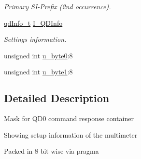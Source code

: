 \begin{DoxyCompactItemize}
\begin{DoxyCompactList}\small\item\em Primary SI-\/Prefix (2nd occurrence). \item\end{DoxyCompactList}\item 
\hypertarget{structFluke_1_1Fluke189_1_1cmdr__QD0__t_a3a8552b047596e62890977125cda5447}{
\hyperlink{structFluke_1_1Fluke189_1_1qdInfo__t}{qdInfo\_\-t} \hyperlink{structFluke_1_1Fluke189_1_1cmdr__QD0__t_a3a8552b047596e62890977125cda5447}{I\_\-QDInfo}}
\label{structFluke_1_1Fluke189_1_1cmdr__QD0__t_a3a8552b047596e62890977125cda5447}

\begin{DoxyCompactList}\small\item\em Settings information. \item\end{DoxyCompactList}\item 
unsigned int \hyperlink{structFluke_1_1Fluke189_1_1cmdr__QD0__t_a8255c6d6c66768208d4a020146369013}{u\_\-byte0}:8
\item 
unsigned int \hyperlink{structFluke_1_1Fluke189_1_1cmdr__QD0__t_a835768e5aabd53d41e1e7a4d10fdde1f}{u\_\-byte1}:8
\end{DoxyCompactItemize}


\subsection{Detailed Description}
Mask for QD0 command response container\par
 Showing setup information of the multimeter\par
 Packed in 8 bit wise via pragma\par
 


